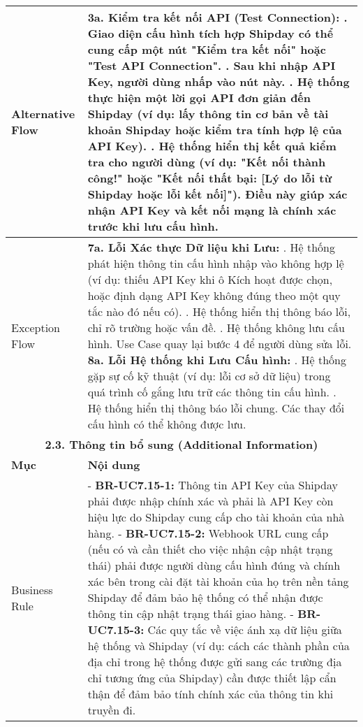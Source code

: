 \begin{longtable}{|m{4cm}|p{11cm}|}
\hline
Alternative Flow & \textbf{3a. Kiểm tra kết nối API (Test Connection):} \newline    1. Giao diện cấu hình tích hợp Shipday có thể cung cấp một nút "Kiểm tra kết nối" hoặc "Test API Connection". \newline    2. Sau khi nhập API Key, người dùng nhấp vào nút này. \newline    3. Hệ thống thực hiện một lời gọi API đơn giản đến Shipday (ví dụ: lấy thông tin cơ bản về tài khoản Shipday hoặc kiểm tra tính hợp lệ của API Key). \newline    4. Hệ thống hiển thị kết quả kiểm tra cho người dùng (ví dụ: "Kết nối thành công!" hoặc "Kết nối thất bại: [Lý do lỗi từ Shipday hoặc lỗi kết nối]"). Điều này giúp xác nhận API Key và kết nối mạng là chính xác trước khi lưu cấu hình. \\
\hline
Exception Flow & \textbf{7a. Lỗi Xác thực Dữ liệu khi Lưu:} \newline    1. Hệ thống phát hiện thông tin cấu hình nhập vào không hợp lệ (ví dụ: thiếu API Key khi ô Kích hoạt được chọn, hoặc định dạng API Key không đúng theo một quy tắc nào đó nếu có). \newline    2. Hệ thống hiển thị thông báo lỗi, chỉ rõ trường hoặc vấn đề. \newline    3. Hệ thống không lưu cấu hình. Use Case quay lại bước 4 để người dùng sửa lỗi. \newline \textbf{8a. Lỗi Hệ thống khi Lưu Cấu hình:} \newline    1. Hệ thống gặp sự cố kỹ thuật (ví dụ: lỗi cơ sở dữ liệu) trong quá trình cố gắng lưu trữ các thông tin cấu hình. \newline    2. Hệ thống hiển thị thông báo lỗi chung. Các thay đổi cấu hình có thể không được lưu. \\
\hline
\multicolumn{2}{|c|}{\textbf{2.3. Thông tin bổ sung (Additional Information)}} \\
\hline
\textbf{Mục} & \textbf{Nội dung} \\
\hline
Business Rule & - \textbf{BR-UC7.15-1:} Thông tin API Key của Shipday phải được nhập chính xác và phải là API Key còn hiệu lực do Shipday cung cấp cho tài khoản của nhà hàng. \newline - \textbf{BR-UC7.15-2:} Webhook URL cung cấp (nếu có và cần thiết cho việc nhận cập nhật trạng thái) phải được người dùng cấu hình đúng và chính xác bên trong cài đặt tài khoản của họ trên nền tảng Shipday để đảm bảo hệ thống có thể nhận được thông tin cập nhật trạng thái giao hàng. \newline - \textbf{BR-UC7.15-3:} Các quy tắc về việc ánh xạ dữ liệu giữa hệ thống và Shipday (ví dụ: cách các thành phần của địa chỉ trong hệ thống được gửi sang các trường địa chỉ tương ứng của Shipday) cần được thiết lập cẩn thận để đảm bảo tính chính xác của thông tin khi truyền đi. \\

\end{longtable}
